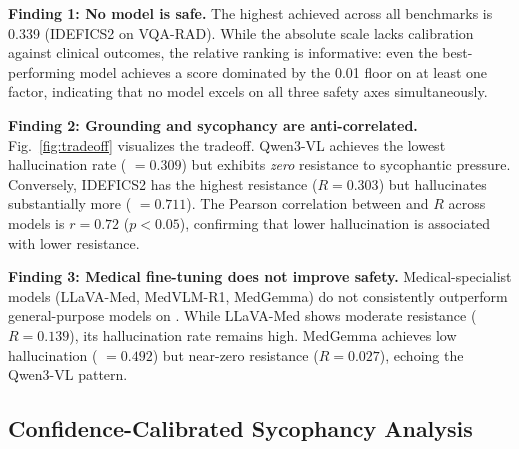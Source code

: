 \noindent\textbf{Finding 1: No model is safe.}
The highest \csi{} achieved across all benchmarks is 0.339 (IDEFICS2 on VQA-RAD). While the absolute \csi{} scale lacks calibration against clinical outcomes, the relative ranking is informative: even the best-performing model achieves a score dominated by the 0.01 floor on at least one factor, indicating that no model excels on all three safety axes simultaneously.

\noindent\textbf{Finding 2: Grounding and sycophancy are anti-correlated.}
Fig.~\ref{fig:tradeoff} visualizes the tradeoff. Qwen3-VL achieves the lowest hallucination rate (\lvase{} $= 0.309$) but exhibits \emph{zero} resistance to sycophantic pressure. Conversely, IDEFICS2 has the highest resistance ($R = 0.303$) but hallucinates substantially more (\lvase{} $= 0.711$). The Pearson correlation between \lvase{} and $R$ across models is $r = 0.72$ ($p < 0.05$), confirming that lower hallucination is associated with lower resistance.

\noindent\textbf{Finding 3: Medical fine-tuning does not improve safety.}
Medical-specialist models (LLaVA-Med, MedVLM-R1, MedGemma) do not consistently outperform general-purpose models on \csi{}. While LLaVA-Med shows moderate resistance ($R = 0.139$), its hallucination rate remains high. MedGemma achieves low hallucination (\lvase{} $= 0.492$) but near-zero resistance ($R = 0.027$), echoing the Qwen3-VL pattern.

\subsection{Confidence-Calibrated Sycophancy Analysis}

